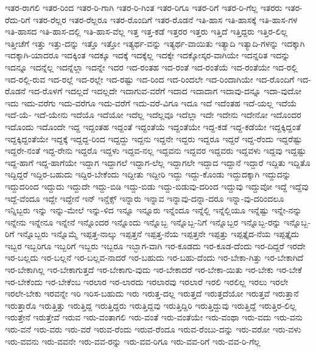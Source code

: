 {ಇತರ-ರಾಗಲಿ
ಇತರ-ರಿಂದ
ಇತರ-ರಿ-ಗಾಗಿ
ಇತರ-ರಿ-ಗಿಂತ
ಇತರ-ರಿಗೂ
ಇತರ-ರಿಗೆ
ಇತರ-ರಿ-ಗೆಲ್ಲ
ಇತರರು
ಇತರ-ರೆದು-ರಿಗೆ
ಇತರ-ರೆಲ್ಲರ
ಇತರ-ರೆಲ್ಲರೂ
ಇತರ-ರೊಂದಿಗೆ
ಇತರ-ರೊಡನೆ
ಇತಿ-ಹಾಸ
ಇತಿ-ಹಾಸಕ್ಕೆ
ಇತಿ-ಹಾಸ-ಗಳ
ಇತಿ-ಹಾಸದ
ಇತಿ-ಹಾಸ-ದಲ್ಲಿ
ಇತಿ-ಹಾಸ-ವೆಲ್ಲ
ಇತ್ತ
ಇತ್ತ-ಕಡೆ
ಇತ್ತರರ
ಇತ್ತರು
ಇತ್ತಿದೆ
ಇತ್ತಿದ್ದರು
ಇತ್ತಿರ-ಲಿಲ್ಲ
ಇತ್ತೀಚೆಗೆ
ಇತ್ತು
ಇತ್ತು-ದನ್ನು
ಇತ್ತೊ
ಇತ್ತೋ
ಇತ್ಯರ್ಥ-ವನ್ನು
ಇತ್ಯರ್ಥ-ವಾಯಿತು
ಇತ್ಯಾದಿ
ಇತ್ಯಾದಿ-ಗಳನ್ನು
ಇದಕ್ಕಾಗಿ
ಇದಕ್ಕಾಗಿ-ಯಾದರೂ
ಇದಕ್ಕಿಂತ
ಇದಕ್ಕೂ
ಇದಕ್ಕೆ
ಇದಕ್ಕೆಲ್ಲ
ಇದಕ್ಕೇ
ಇದಕ್ಕೋಸ್ಕರ-ವಾಗಿಯೇ
ಇದನ್ನರಿತ
ಇದನ್ನು
ಇದನ್ನೂ
ಇದನ್ನೆಲ್ಲ
ಇದನ್ನೆಲ್ಲಾ
ಇದನ್ನೇ
ಇದರ
ಇದ-ರಂತಹ
ಇದ-ರಂತೆ
ಇದ-ರಂತೆಯೆ
ಇದ-ರಂತೆಯೇ
ಇದ-ರಲ್ಲಿ
ಇದ-ರಲ್ಲಿ-ರುವ
ಇದ-ರಲ್ಲೆ
ಇದ-ರಲ್ಲೇ
ಇದ-ರಷ್ಟು
ಇದ-ರಿಂದ
ಇದ-ರಿಂದಲೇ
ಇದ-ರಿಂದಾಗಿಯೇ
ಇದ-ರೊಂದಿಗೆ
ಇದ-ರೊಡನೆ
ಇದ-ರೊಳಗೆ
ಇದಲ್ಲದೆ
ಇದಲ್ಲದೇ
ಇದಾಗುವ-ವರೆಗೆ
ಇದಾದ
ಇದಾದಾಗ
ಇದಾವು-ದನ್ನೂ
ಇದಾ-ವುದೋ
ಇದು
ಇದು-ವರೆಗು
ಇದು-ವರೆಗೂ
ಇದು-ವರೆಗೆ
ಇದು-ವರೆ-ವಿಗೂ
ಇದೂ
ಇದೆ
ಇದೆಂತಹ
ಇದೆ-ಯಲ್ಲ
ಇದೆಯೆ
ಇದೆ-ಯೆ-
ಇದೆ-ಯೇನು
ಇದೆಯೊ
ಇದೆಯೋ
ಇದೆಲ್ಲ
ಇದೆಲ್ಲವೂ
ಇದೆಲ್ಲಾ
ಇದೇ
ಇದೇನು
ಇದೇನೋ
ಇದೊಂದರ
ಇದೊಂದು
ಇದೊಂದೇ
ಇದ್ದ
ಇದ್ದಂತಹ
ಇದ್ದಂತೆ
ಇದ್ದಂತೆಯೆ
ಇದ್ದಂತೆಯೇ
ಇದ್ದ-ಕಡೆ
ಇದ್ದ-ಕಡೆಯೇ
ಇದ್ದಕ್ಕಿದ್ದಂತೆ
ಇದ್ದಕ್ಕಿದ್ದಂತೆಯೇ
ಇದ್ದಕ್ಕೆ
ಇದ್ದದ್ದ-ರಿಂದ
ಇದ್ದದ್ದು
ಇದ್ದನು
ಇದ್ದನೇ
ಇದ್ದರು
ಇದ್ದರೂ
ಇದ್ದರೆ
ಇದ್ದ-ರೆಂದು
ಇದ್ದರೆಷ್ಟು
ಇದ್ದರೇ-ನಂತೆ
ಇದ್ದ-ರೇನು
ಇದ್ದರೊ
ಇದ್ದಳು
ಇದ್ದವ-ನಲ್ಲ
ಇದ್ದವನು
ಇದ್ದವರ
ಇದ್ದವರು
ಇದ್ದವಳು
ಇದ್ದವು
ಇದ್ದಷ್ಟು
ಇದ್ದ-ಹಾಗೆ
ಇದ್ದ-ಹಾಗೆಯೇ
ಇದ್ದಾಗ
ಇದ್ದಾಗಲೆ
ಇದ್ದಾಗ-ಲೆಲ್ಲ
ಇದ್ದಾಗಲೇ
ಇದ್ದಾದ
ಇದ್ದಾನೆ
ಇದ್ದಾರೆ
ಇದ್ದಿತು
ಇದ್ದಿತೊ
ಇದ್ದಿದ್ದರೆ
ಇದ್ದಿರ-ಬಹುದು
ಇದ್ದಿರ-ಬೇಕೆಂದು
ಇದ್ದೀತು
ಇದ್ದೀರಿ
ಇದ್ದು
ಇದ್ದು-ಕೊಂಡು
ಇದ್ದುದಕ್ಕಾಗಿ
ಇದ್ದುದನ್ನು
ಇದ್ದುದರಿಂದ
ಇದ್ದುದು
ಇದ್ದುದೇ
ಇದ್ದು-ಬಿಡಿ
ಇದ್ದು-ಬಿಡು
ಇದ್ದು-ಬಿಡುವು-ದರಿಂದ
ಇದ್ದುವು
ಇದ್ದುವೋ
ಇದ್ದೆ
ಇದ್ದೆವು
ಇದ್ದೆ-ವೆಂದೂ
ಇದ್ದೇ
ಇದ್ದೇನೆ
ಇನ್
ಇನ್ಡೆಕ್ಸ್
ಇನ್ನಾರು
ಇನ್ನಾವ
ಇನ್ನಾವು-ದನ್ನಾ-ದರೂ
ಇನ್ನಾ-ವು-ದರಿಂದಲೂ
ಇನ್ನಿಬ್ಬರು
ಇನ್ನು
ಇನ್ನು-ಮೇಲೆ
ಇನ್ನು-ಳಿದ
ಇನ್ನೂ
ಇನ್ನೂರು
ಇನ್ನೆಂದೂ
ಇನ್ನೆಲ್ಲಿ
ಇನ್ನೆಲ್ಲಿಯೂ
ಇನ್ನೆಷ್ಟು
ಇನ್ನೇ-ನನ್ನು
ಇನ್ನೇನು
ಇನ್ನೇನೂ
ಇನ್ನೇನೆ
ಇನ್ನೊಂದರ
ಇನ್ನೊಂದು
ಇನ್ನೊಬ್ಬ
ಇನ್ನೊಬ್ಬ-ನಿಗೆ
ಇನ್ನೊಬ್ಬರ
ಇನ್ನೊಬ್ಬ-ರನ್ನು
ಇನ್ನೊಬ್ಬ-ರಿಗೆ
ಇನ್ನೊಬ್ಬರು
ಇನ್ನೊಮ್ಮೆ
ಇಪ್ಪತ್ತ-ನಾಲ್ಕು
ಇಪ್ಪತ್ತನೆ
ಇಪ್ಪತ್ತ-ನೆಯ
ಇಪ್ಪತ್ತನೇ
ಇಪ್ಪತ್ತು
ಇಪ್ಪತ್ತೈದ-ನೆಯ
ಇಪ್ಪತ್ತೈದು
ಇಬ್ಬರ
ಇಬ್ಬರಿಗೂ
ಇಬ್ಬರಿಗೆ
ಇಬ್ಬರು
ಇಬ್ಬರೂ
ಇಬ್ಭಾಗ-ವಾಗಿ
ಇರ-ಕೂಡದು
ಇರ-ಕೂಡ-ದೆಂದು
ಇರ-ದಿದ್ದರೆ
ಇರದೇ
ಇರ-ಬಲ್ಲದು
ಇರ-ಬಲ್ಲನೆ
ಇರ-ಬಲ್ಲವ-ನಾದರೆ
ಇರ-ಬಹುದು
ಇರ-ಬಹು-ದೆಂದು
ಇರ-ಬೇಕಾ-ಗಿತ್ತು
ಇರ-ಬೇಕಾಗಿದೆ
ಇರ-ಬೇಕಾಗಿಲ್ಲ
ಇರ-ಬೇಕಾಗುತ್ತದೆ
ಇರ-ಬೇಕಾಗು-ವುದು
ಇರ-ಬೇಕಾದರೆ
ಇರ-ಬೇಕಾ-ಯಿತು
ಇರ-ಬೇಕು
ಇರ-ಬೇಕೆ
ಇರ-ಬೇಕೆಂದು
ಇರ-ಬೇಕೆಂಬ
ಇರಲಾರ
ಇರ-ಲಾರದು
ಇರಲಾರವು
ಇರಲಾರೆ
ಇರಲಿ
ಇರಲಿಲ್ಲ
ಇರಲು
ಇರಲೇ
ಇರಲೇ-ಬೇಕು
ಇರವನ್ನೇ
ಇರಿ
ಇರಿಸ-ಬಹುದು
ಇರು
ಇರುತ್ತ-ದಲ್ಲ
ಇರುತ್ತದೆ
ಇರುತ್ತದೆಯೋ
ಇರುತ್ತವೆ
ಇರುತ್ತಾನೆ
ಇರುತ್ತಾರೊ
ಇರುತ್ತಿತ್ತು
ಇರುತ್ತಿದ್ದ
ಇರುತ್ತಿದ್ದರು
ಇರುತ್ತಿದ್ದವು
ಇರುತ್ತಿದ್ದಿರಿ
ಇರುತ್ತಿದ್ದುವು
ಇರುತ್ತಿದ್ದೆ
ಇರುತ್ತಿರ-ಲಿಲ್ಲ
ಇರುತ್ತೇನೆ
ಇರುತ್ತೇವೆ
ಇರುವ
ಇರು-ವಂತಾಗಲಿ
ಇರು-ವಂತೆ
ಇರು-ವಂತೆಯೇ
ಇರು-ವಂಥಾ
ಇರು-ವದು
ಇರು-ವನು
ಇರು-ವನೆ
ಇರು-ವರು
ಇರು-ವರೆ
ಇರುವ-ರೆಂದು
ಇರುವ-ರೆಂದೂ
ಇರುವ-ರೆಂಬು-ದನ್ನು
ಇರು-ವರೋ
ಇರು-ವಳು
ಇರು-ವವನು
ಇರು-ವವನೇ
ಇರು-ವವ-ರನ್ನು
ಇರು-ವವ-ರಿಗೂ
ಇರು-ವವ-ರಿಗೆ
ಇರು-ವವ-ರಿ-ಗೆಲ್ಲ
}
